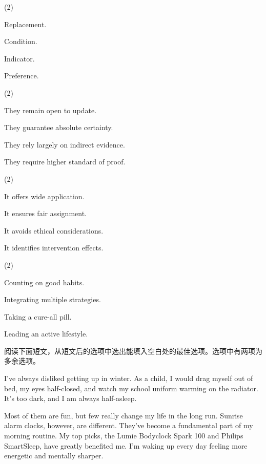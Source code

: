 \documentclass{英语试卷}
\begin{document}
\begin{choices}(2)
  \item Replacement.
  \item Condition.
  \item Indicator.
  \item Preference.
\end{choices}
\begin{choices}(2)
  \item They remain open to update.
  \item They guarantee absolute certainty.
  \item They rely largely on indirect evidence.
  \item They require higher standard of proof.
\end{choices}
\begin{choices}(2)
  \item It offers wide application.
  \item It ensures fair assignment.
  \item It avoids ethical considerations.
  \item It identifies intervention effects.
\end{choices}
\begin{choices}(2)
  \item Counting on good habits.
  \item Integrating multiple strategies.
  \item Taking a cure-all pill.
  \item Leading an active lifestyle.
\end{choices}
\par 阅读下面短文，从短文后的选项中选出能填入空白处的最佳选项。选项中有两项为多余选项。\par
\par I've always disliked getting up in winter. As a child, I would drag myself out of bed, my eyes half-closed, and watch my school uniform warming on the radiator.  It's too dark, and I am always half-asleep.\par
\par {} Most of them are fun, but few really change my life in the long run. Sunrise alarm clocks, however, are different. They've become a fundamental part of my morning routine. My top picks, the Lumie Bodyclock Spark 100 and Philips SmartSleep, have greatly benefited me. I'm waking up every day feeling more energetic and mentally sharper.\par
\end{document}
